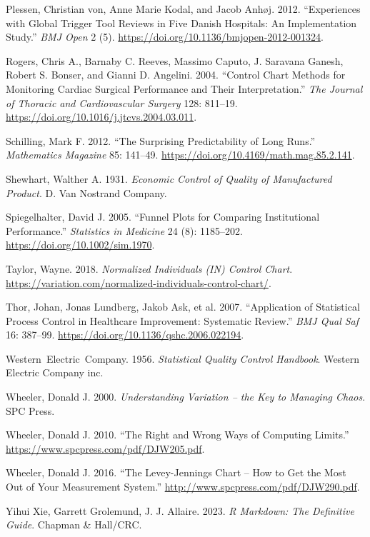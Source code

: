 \documentclass[
]{book}
\newlength{\cslhangindent}
\newenvironment{CSLReferences}[2] %
 {\begin{list}{}{%
  \setlength{\itemindent}{0pt}
  \setlength{\leftmargin}{0pt}
  \setlength{\parsep}{0pt}
  \ifodd #1
   \setlength{\leftmargin}{\cslhangindent}
   \setlength{\itemindent}{-1\cslhangindent}
  \fi
  \setlength{\itemsep}{#2\baselineskip}}}
 {\end{list}}
\begin{document}
\begin{CSLReferences}{1}{1}
Plessen, Christian von, Anne Marie Kodal, and Jacob Anhøj. 2012.
{``Experiences with Global Trigger Tool Reviews in Five Danish
Hospitals: An Implementation Study.''} \emph{BMJ Open} 2 (5).
\url{https://doi.org/10.1136/bmjopen-2012-001324}.

Rogers, Chris A., Barnaby C. Reeves, Massimo Caputo, J. Saravana Ganesh,
Robert S. Bonser, and Gianni D. Angelini. 2004. {``Control Chart Methods
for Monitoring Cardiac Surgical Performance and Their Interpretation.''}
\emph{The Journal of Thoracic and Cardiovascular Surgery} 128: 811--19.
\url{https://doi.org/10.1016/j.jtcvs.2004.03.011}.

Schilling, Mark F. 2012. {``The Surprising Predictability of Long
Runs.''} \emph{Mathematics Magazine} 85: 141--49.
\url{https://doi.org/10.4169/math.mag.85.2.141}.

Shewhart, Walther A. 1931. \emph{Economic Control of Quality of
Manufactured Product}. D. Van Nostrand Company.

Spiegelhalter, David J. 2005. {``Funnel Plots for Comparing
Institutional Performance.''} \emph{Statistics in Medicine} 24 (8):
1185--202. \url{https://doi.org/10.1002/sim.1970}.

Taylor, Wayne. 2018. \emph{Normalized Individuals (IN) Control Chart}.
\url{https://variation.com/normalized-individuals-control-chart/}.

Thor, Johan, Jonas Lundberg, Jakob Ask, et al. 2007. {``Application of
Statistical Process Control in Healthcare Improvement: Systematic
Review.''} \emph{BMJ Qual Saf} 16: 387--99.
\url{https://doi.org/10.1136/qshc.2006.022194}.

Western~Electric~Company. 1956. \emph{Statistical Quality Control
Handbook}. Western Electric Company inc.

Wheeler, Donald J. 2000. \emph{Understanding Variation -- the Key to
Managing Chaos}. SPC Press.

Wheeler, Donald J. 2010. {``The Right and Wrong Ways of Computing
Limits.''} \url{https://www.spcpress.com/pdf/DJW205.pdf}.

Wheeler, Donald J. 2016. {``The Levey-Jennings Chart -- How to Get the
Most Out of Your Measurement System.''}
\url{http://www.spcpress.com/pdf/DJW290.pdf}.

Yihui Xie, Garrett Grolemund, J. J. Allaire. 2023. \emph{R Markdown: The
Definitive Guide}. Chapman \& Hall/CRC.

\end{CSLReferences}

\backmatter
\end{document}
